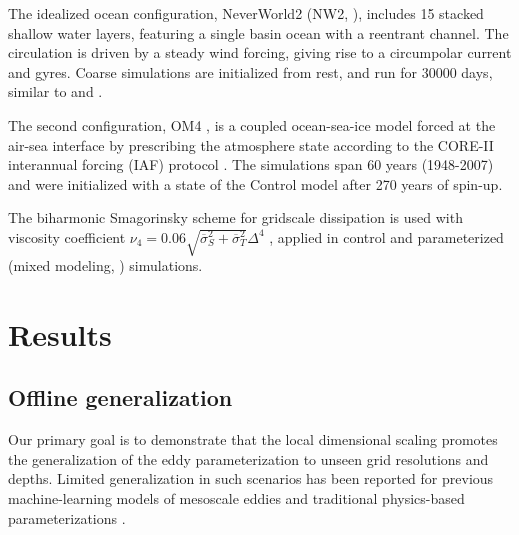 \documentclass[draft]{agujournal2019}
\begin{document}
The idealized ocean configuration, NeverWorld2 (NW2, ), includes 15 stacked shallow water layers, featuring a single basin ocean with a reentrant channel. The circulation is driven by a steady wind forcing, giving rise to a circumpolar current and gyres. Coarse simulations are initialized from rest, and run for $30000$ days, similar to  and .

The second configuration, OM4 \cite{adcroft2019gfdl}, is a coupled ocean-sea-ice model forced at the air-sea interface by prescribing the atmosphere state according to the CORE-II interannual forcing (IAF) protocol \cite{large2009global}. The simulations span 60 years (1948-2007) and were initialized with a state of the Control model after 270 years of spin-up.

The biharmonic Smagorinsky scheme for gridscale dissipation is used with viscosity coefficient $\nu_4 = 0.06 \sqrt{\overline{\sigma}_S^2+\overline{\sigma}_T^2} \Delta^4$   \cite{adcroft2019gfdl}, applied in control and parameterized (mixed modeling, ) simulations. 




\section{Results}

\subsection{Offline generalization}
Our primary goal is to demonstrate that the local dimensional scaling promotes the generalization of the eddy parameterization to unseen grid resolutions and depths. Limited generalization in such scenarios has been reported for previous machine-learning models of mesoscale eddies \cite{zhang2023implementation, gultekin2024analysis,ross2022benchmarking} and traditional physics-based parameterizations \cite{yankovsky2024}. 
\end{document}
